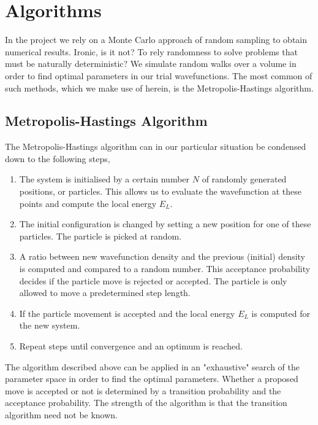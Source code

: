 \documentclass[
    a4paper, aps, twocolumn, floatfix, superscriptaddress, nofootinbib]{revtex4-1}
\newcommand{\1}{\mathds{1}}
\begin{document}
\section{Algorithms}

In the project we rely on a Monte Carlo approach of random sampling to obtain numerical results. 
Ironic, is it not? To rely randomness to solve problems that must be naturally deterministic? 
We simulate random walks over a volume in order to find optimal parameters in our trial wavefunctions. 
The most common of such methods, which we make use of herein, is the Metropolis-Hastings algorithm. 

\subsection{Metropolis-Hastings Algorithm}
The Metropolis-Hastings algorithm can in our particular situation be condensed down to the following steps,
\begin{enumerate}
	\item The system is initialised by a certain number $N$ of randomly generated positions, or particles. This allows us to evaluate the
	 wavefunction at these points and compute the local energy $E_L$.
	\item The initial configuration is changed by setting a new position for one of these particles. The particle is picked at random.
	\item A ratio between new wavefunction density and the previous (initial) density is computed and compared to a random number. 
	This acceptance probability decides if the particle move is rejected or accepted. 
	The particle is only allowed to move a predetermined step length.
	\item If the particle movement is accepted and the local energy $E_L$ is computed for the new system. 
	\item Repeat steps until convergence and an optimum is reached.
\end{enumerate}

The algorithm described above can be applied in an "exhaustive" search of the parameter space in order to find the optimal parameters. 
Whether a proposed move is accepted or not is determined by a transition probability and the acceptance probability. 
The strength of the algorithm is that the transition algorithm need not be known. 
\end{document}
